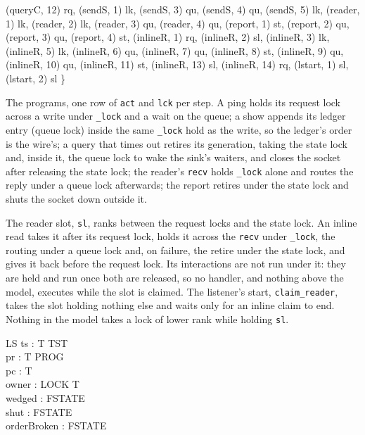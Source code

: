 \documentclass[a4paper,10pt,fleqn]{article}
\begin{document}
\begin{axdef}
    (queryC, 12) \mapsto rq,
    (sendS, 1) \mapsto lk, (sendS, 3) \mapsto qu, (sendS, 4) \mapsto qu,
    (sendS, 5) \mapsto lk,
    (reader, 1) \mapsto lk, (reader, 2) \mapsto lk, (reader, 3) \mapsto qu,
    (reader, 4) \mapsto qu,
    (report, 1) \mapsto st, (report, 2) \mapsto qu, (report, 3) \mapsto qu,
    (report, 4) \mapsto st,
    (inlineR, 1) \mapsto rq, (inlineR, 2) \mapsto sl, (inlineR, 3) \mapsto lk,
    (inlineR, 5) \mapsto lk, (inlineR, 6) \mapsto qu, (inlineR, 7) \mapsto qu,
    (inlineR, 8) \mapsto st, (inlineR, 9) \mapsto qu, (inlineR, 10) \mapsto qu,
    (inlineR, 11) \mapsto st, (inlineR, 13) \mapsto sl, (inlineR, 14) \mapsto rq,
    (lstart, 1) \mapsto sl, (lstart, 2) \mapsto sl \}
\end{axdef}

The programs, one row of \texttt{act} and \texttt{lck} per step.  A ping holds
its request lock across a write under \texttt{\_lock} and a wait on the queue;
a show appends its ledger entry (queue lock) inside the same \texttt{\_lock}
hold as the write, so the ledger's order is the wire's; a query that times out
retires its generation, taking the state lock and, inside it, the queue lock
to wake the sink's waiters, and closes the socket after releasing the state
lock; the reader's \texttt{recv} holds \texttt{\_lock} alone and routes the
reply under a queue lock afterwards; the report retires under the state lock
and shuts the socket down outside it.

The reader slot, \texttt{sl}, ranks between the request locks and the state
lock.  An inline read takes it after its request lock, holds it across the
\texttt{recv} under \texttt{\_lock}, the routing under a queue lock and, on
failure, the retire under the state lock, and gives it back before the request
lock.  Its interactions are not run under it: they are held and run once both
are released, so no handler, and nothing above the model, executes while the
slot is claimed.  The listener's start, \texttt{claim\_reader}, takes the slot
holding nothing else and waits only for an inline claim to end.  Nothing in
the model takes a lock of lower rank while holding \texttt{sl}.

\begin{schema}{LS}
  ts : T \fun TST \\
  pr : T \fun PROG \\
  pc : T   \\
  owner : LOCK \pfun T \\
  wedged : FSTATE \\
  shut : FSTATE \\
  orderBroken : FSTATE
\end{schema}
\end{document}
